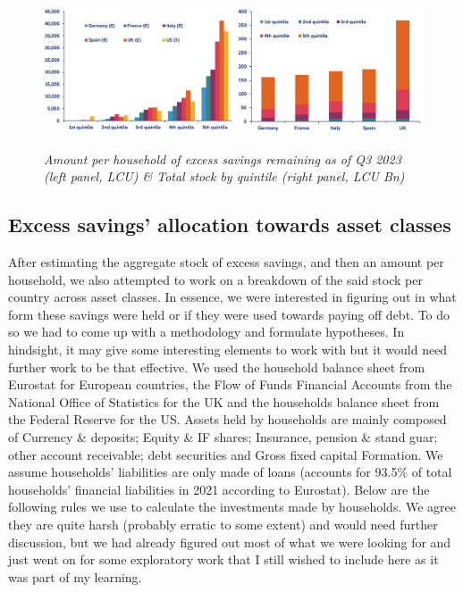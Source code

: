 \begin{figure}[H]
    \centering
    \caption{\textit{Amount per household of excess savings remaining as of Q3 2023 (left panel, LCU) \& Total stock by quintile (right panel, LCU Bn)}}
    \includegraphics[width=1\textwidth]{Core/1.Savings/img/xSavings.png}
    \label{figure:Savings}
\end{figure}

\subsection{Excess savings' allocation towards asset classes}

\quad After estimating the aggregate stock of excess savings, and then an amount per household, we also attempted to work on a breakdown of the said stock per country across asset classes. 
In essence, we were interested in figuring out in what form these savings were held or if they were used towards paying off debt. To do so we had to come up with a methodology and formulate hypotheses. 
In hindsight, it may give some interesting elements to work with but it would need further work to be that effective. 
We used the household balance sheet from Eurostat for European countries, the Flow of Funds Financial Accounts from the National Office of Statistics for the UK and the households balance sheet from the Federal Reserve for the US. 
Assets held by households are mainly composed of Currency \& deposits; Equity \& IF shares; Insurance, pension \& stand guar; other account receivable;	debt securities and Gross fixed capital Formation. We assume households’ liabilities are only made of loans (accounts for 93.5\% of total households' financial liabilities in 2021 according to Eurostat). 
Below are the following rules we use to calculate the investments made by households. We agree they are quite harsh (probably erratic to some extent) and would need further discussion, but we had already figured out most of what we were looking for and just went on for some exploratory work that I still wished to include here as it was part of my learning.

